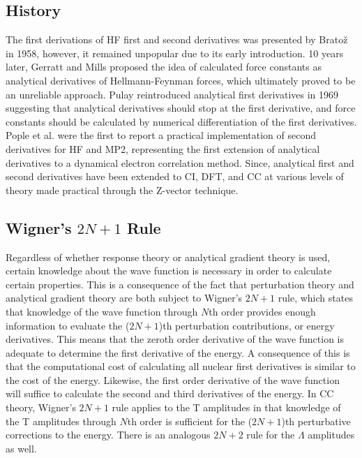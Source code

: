 \subsection{History}
    The first derivations of HF first and second derivatives was presented by Brato{\v{z}}\cite{Bratoz1958} in 1958, however, it remained unpopular due to its early introduction. 10 years later, Gerratt and Mills\cite{Gerratt1968} proposed the idea of calculated force constants as analytical derivatives of Hellmann-Feynman forces, which ultimately proved to be an unreliable approach. Pulay reintroduced analytical first derivatives in 1969\cite{Pulay1969} suggesting that analytical derivatives should stop at the first derivative, and force constants should be calculated by numerical differentiation of the first derivatives. Pople et al.\cite{Pople1979} were the first to report a practical implementation of second derivatives for HF and MP2, representing the first extension of analytical derivatives to a dynamical electron correlation method. Since, analytical first and second derivatives have been extended to CI\cite{Krishnan1980,Brooks1980}, DFT, and CC at various levels of theory\cite{Scheiner1987,Lee1991,Koch1990a,Gauss1997} made practical through the Z-vector technique\cite{Hoffmann1984}.
\subsection{Wigner's $2N+1$ Rule}
    Regardless of whether response theory or analytical gradient theory is used, certain knowledge about the wave function is necessary in order to calculate certain properties. This is a consequence of the fact that perturbation theory and analytical gradient theory are both subject to Wigner's $2N+1$ rule\cite{Wigner1935}, which states that knowledge of the wave function through $N$th order provides enough information to evaluate the ($2N+1$)th perturbation contributions, or energy derivatives. This means that the zeroth order derivative of the wave function is adequate to determine the first derivative of the energy. A consequence of this is that the computational cost of calculating all nuclear first derivatives is similar to the cost of the energy. Likewise, the first order derivative of the wave function will suffice to calculate the second and third derivatives of the energy. In CC theory, Wigner's $2N+1$ rule applies to the T amplitudes in that knowledge of the T amplitudes through $N$th order is sufficient for the ($2N+1$)th perturbative corrections to the energy. There is an analogous $2N+2$ rule for the $\Lambda$ amplitudes as well\cite{Eriksen2014}. 
